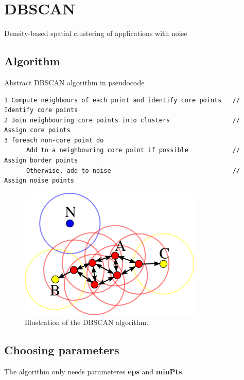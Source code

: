 \documentclass[]{book}
\theoremstyle{definition}
\theoremstyle{definition}
\theoremstyle{definition}
\theoremstyle{remark}
\begin{document}
\section{DBSCAN}\label{dbscan}

Density-based spatial clustering of applications with noise

\subsection{Algorithm}\label{algorithm-1}

Abstract DBSCAN algorithm in pseudocode \citep{Schubert2017}

\begin{verbatim}
1 Compute neighbours of each point and identify core points   // Identify core points
2 Join neighbouring core points into clusters                 // Assign core points
3 foreach non-core point do
      Add to a neighbouring core point if possible            // Assign border points
      Otherwise, add to noise                                 // Assign noise points
\end{verbatim}

\begin{figure}

{\centering \includegraphics[width=0.75\linewidth]{images/DBSCAN_Illustration} 

}

\caption{Illustration of the DBSCAN algorithm.}\label{fig:dbscanIllustration}
\end{figure}

\subsection{Choosing parameters}\label{choosing-parameters}

The algorithm only needs parameteres \textbf{eps} and \textbf{minPts}.
\end{document}
